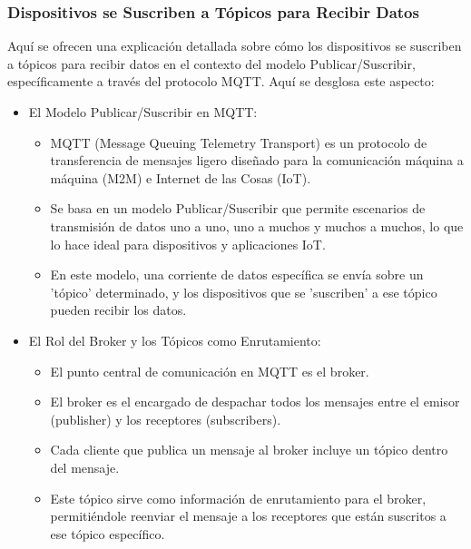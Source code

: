 \documentclass{report}
\begin{document}
\subsubsection{Dispositivos se Suscriben a Tópicos para Recibir Datos}
Aquí se ofrecen una explicación detallada sobre cómo los dispositivos se suscriben a tópicos para recibir 
datos en el contexto del modelo Publicar/Suscribir, específicamente a través del protocolo MQTT.
Aquí se desglosa este aspecto:
\begin{itemize}
    \item El Modelo Publicar/Suscribir en MQTT:
        \begin{itemize}
            \item MQTT (Message Queuing Telemetry Transport) es un protocolo de transferencia de mensajes ligero diseñado para la 
            comunicación máquina a máquina (M2M) e Internet de las Cosas (IoT).
            \item Se basa en un modelo Publicar/Suscribir que permite escenarios de transmisión de datos uno a uno, uno a muchos y 
            muchos a muchos, lo que lo hace ideal para dispositivos y aplicaciones IoT.
            \item En este modelo, una corriente de datos específica se envía sobre un 'tópico' determinado, y los dispositivos 
            que se 'suscriben' a ese tópico pueden recibir los datos.
        \end{itemize}

    \item El Rol del Broker y los Tópicos como Enrutamiento:
        \begin{itemize}
            \item El punto central de comunicación en MQTT es el broker.
            \item El broker es el encargado de despachar todos los mensajes entre el emisor (publisher) y los receptores (subscribers).
            \item Cada cliente que publica un mensaje al broker incluye un tópico dentro del mensaje.
            \item Este tópico sirve como información de enrutamiento para el broker, permitiéndole reenviar el mensaje a los 
            receptores que están suscritos a ese tópico específico.
        \end{itemize}


\end{itemize}
\end{document}
